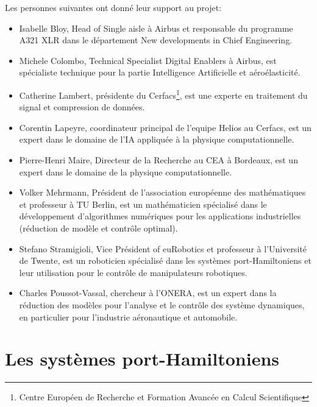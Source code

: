 \documentclass[12pt, french]{article}
\begin{document}
	Les personnes suivantes ont donné leur support au projet:
	\begin{itemize}
		\item Isabelle Bloy, Head of Single aisle  à Airbus et responsable du programme A321 XLR dans le département New developments in Chief Engineering.
		\item Michele Colombo, Technical Specialist Digital Enablers à Airbus, est spécialiste technique pour la partie Intelligence Artificielle et aéroélasticité.
		\item Catherine Lambert, présidente du Cerfacs\footnote{Centre Européen de Recherche et Formation Avancée en Calcul Scientifique}, est une experte en traitement du signal et compression de données. 
		\item Corentin Lapeyre, coordinateur principal de l'equipe Helios au Cerfacs, est un expert dans le domaine de l'IA appliquée à la physique computationnelle.
		\item Pierre-Henri Maire, Directeur de la Recherche au CEA à Bordeaux, est un expert dans le domaine de la physique computationnelle.
		\item Volker Mehrmann, Président de l'association européenne des mathématiques et professeur à TU Berlin, est un mathématicien spécialisé dans le développement d'algorithmes numériques pour les applications industrielles (réduction de modèle et contrôle optimal).
		\item Stefano Stramigioli, Vice Président of euRobotics et professeur à l'Université de Twente, est un roboticien spécialisé dans les systèmes port-Hamiltoniens et leur utilisation pour le contrôle de manipulateurs robotiques.
		\item Charles Poussot-Vassal, chercheur à l'ONERA, est un expert dans la réduction des modèles pour l'analyse et le contrôle des système dynamiques, en particulier pour l'industrie aéronautique et automobile.
	\end{itemize}









\section{Les systèmes port-Hamiltoniens}\label{sec:pHreview}
\end{document}
